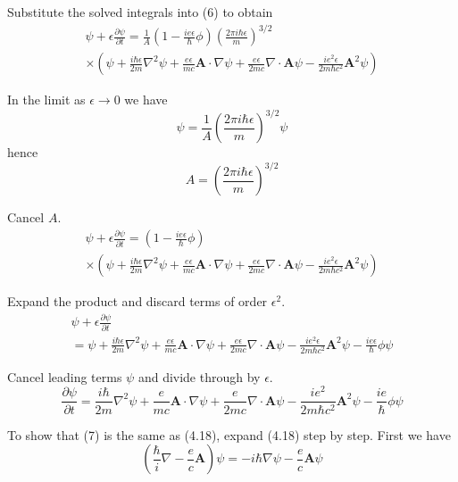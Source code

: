 \documentclass[12pt]{article}
\begin{document}
Substitute the solved integrals into (6) to obtain
\begin{multline*}
\psi+\epsilon\frac{\partial\psi}{\partial t}
=\frac{1}{A}
\left(1-\frac{ie\epsilon}{\hbar}\phi\right)\left(\frac{2\pi i\hbar\epsilon}{m}\right)^{3/2}
\\
\times\left(
\psi
+\frac{i\hbar\epsilon}{2m}\nabla^2\psi
+\frac{e\epsilon}{mc}\mathbf A\cdot\nabla\psi
+\frac{e\epsilon}{2mc}\nabla\cdot\mathbf A\psi
-\frac{ie^2\epsilon}{2m\hbar c^2}\mathbf A^2\psi
\right)
\end{multline*}

In the limit as $\epsilon\rightarrow0$ we have
\begin{equation*}
\psi=\frac{1}{A}\left(\frac{2\pi i\hbar\epsilon}{m}\right)^{3/2}\psi
\end{equation*}
hence
\begin{equation*}
A=\left(\frac{2\pi i\hbar\epsilon}{m}\right)^{3/2}
\end{equation*}

Cancel $A$.
\begin{multline*}
\psi+\epsilon\frac{\partial\psi}{\partial t}
=\left(1-\frac{ie\epsilon}{\hbar}\phi\right)
\\
\times\left(
\psi
+\frac{i\hbar\epsilon}{2m}\nabla^2\psi
+\frac{e\epsilon}{mc}\mathbf A\cdot\nabla\psi
+\frac{e\epsilon}{2mc}\nabla\cdot\mathbf A\psi
-\frac{ie^2\epsilon}{2m\hbar c^2}\mathbf A^2\psi
\right)
\end{multline*}

Expand the product and discard terms of order $\epsilon^2$.
\begin{multline*}
\psi+\epsilon\frac{\partial\psi}{\partial t}
\\
=\psi
+\frac{i\hbar\epsilon}{2m}\nabla^2\psi
+\frac{e\epsilon}{mc}\mathbf A\cdot\nabla\psi
+\frac{e\epsilon}{2mc}\nabla\cdot\mathbf A\psi
-\frac{ie^2\epsilon}{2m\hbar c^2}\mathbf A^2\psi
-\frac{ie\epsilon}{\hbar}\phi\psi
\end{multline*}

Cancel leading terms $\psi$ and divide through by $\epsilon$.
\begin{equation*}
\frac{\partial\psi}{\partial t}
=\frac{i\hbar}{2m}\nabla^2\psi
+\frac{e}{mc}\mathbf A\cdot\nabla\psi
+\frac{e}{2mc}\nabla\cdot\mathbf A\psi
-\frac{ie^2}{2m\hbar c^2}\mathbf A^2\psi
-\frac{ie}{\hbar}\phi\psi
\tag{7}
\end{equation*}

To show that (7) is the same as (4.18), expand (4.18) step by step.
First we have
\begin{equation*}
\left(\frac{\hbar}{i}\nabla-\frac{e}{c}\mathbf A\right)\psi
=-i\hbar\nabla\psi-\frac{e}{c}\mathbf A\psi
\end{equation*}
\end{document}
